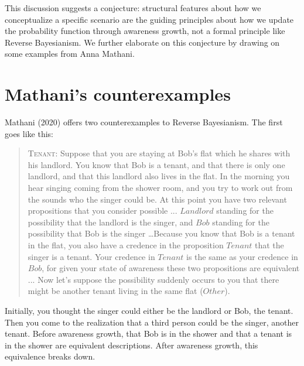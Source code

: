 \documentclass[
  11pt,
  dvipsnames,enabledeprecatedfontcommands]{scrartcl}
\begin{document}
This discussion suggests a conjecture: structural features about how we
conceptualize a specific scenario are the guiding principles about how
we update the probability function through awareness growth, not a
formal principle like Reverse Bayesianism. We further elaborate on this
conjecture by drawing on some examples from Anna Mathani.

\hypertarget{mathanis-counterexamples}{%
\section{Mathani's counterexamples}\label{mathanis-counterexamples}}

\label{sec:mathani}

Mathani (2020) offers two counterexamples to Reverse Bayesianism. The
first goes like this:

\begin{quote}
\textsc{Tenant}: Suppose that you are staying at Bob's flat which he shares with his landlord. You know
that Bob is a tenant, and that there is only one landlord, and that this landlord also
lives in the flat. In the morning you hear singing coming from the shower room, and
you try to work out from the sounds who the singer could be. At this point you have
two relevant propositions that you consider possible ... $Landlord$ standing for the possibility that the landlord is the singer, and $Bob$ standing for the possibility that Bob is the singer  \dots  Because you know that Bob is a tenant in the flat, you also have a credence in the proposition $Tenant$ that the singer is a tenant. Your credence in $Tenant$ is the same as your credence in $Bob$, for given your state of awareness these two propositions are equivalent ... Now let's suppose the possibility suddenly occurs to you that there might be another tenant living in the same flat  ($Other$).
\end{quote}

\doublespace

\noindent Initially, you thought the singer could either be the landlord
or Bob, the tenant. Then you come to the realization that a third person
could be the singer, another tenant. Before awareness growth, that Bob
is in the shower and that a tenant is in the shower are equivalent
descriptions. After awareness growth, this equivalence breaks down.
\end{document}

